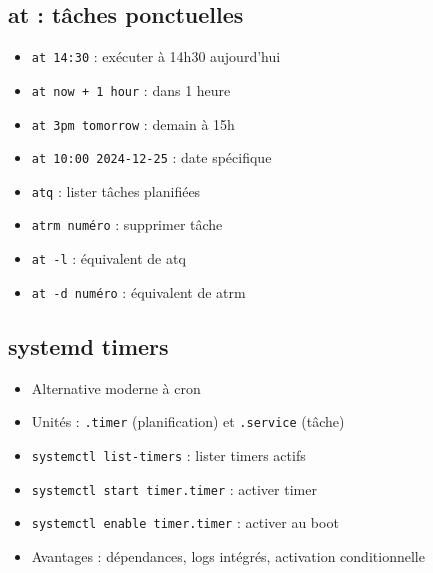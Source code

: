 \documentclass[12pt,a4paper]{article}
\begin{document}
\subsection{at : t\^aches ponctuelles}
\begin{itemize}
    \item \texttt{at 14:30} : ex\'ecuter \`a 14h30 aujourd'hui %
    \item \texttt{at now + 1 hour} : dans 1 heure %
    \item \texttt{at 3pm tomorrow} : demain \`a 15h %
    \item \texttt{at 10:00 2024-12-25} : date sp\'ecifique %
    \item \texttt{atq} : lister t\^aches planifi\'ees %
    \item \texttt{atrm num\'ero} : supprimer t\^ache %
    \item \texttt{at -l} : \'equivalent de atq %
    \item \texttt{at -d num\'ero} : \'equivalent de atrm %
\end{itemize}


\subsection{systemd timers}
\begin{itemize}
    \item Alternative moderne \`a cron %
    \item Unit\'es : \texttt{.timer} (planification) et \texttt{.service} (t\^ache) %
    \item \texttt{systemctl list-timers} : lister timers actifs %
    \item \texttt{systemctl start timer.timer} : activer timer %
    \item \texttt{systemctl enable timer.timer} : activer au boot %
    \item Avantages : d\'ependances, logs int\'egr\'es, activation conditionnelle %
\end{itemize}
\end{document}
